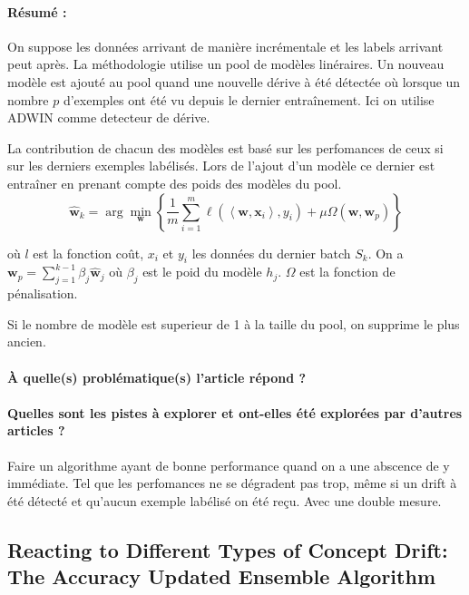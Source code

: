 \documentclass[11pt,a4paper]{report}
\begin{document}
\paragraph{Résumé :} On suppose les données arrivant de manière incrémentale et les labels arrivant peut après. La méthodologie utilise un pool de modèles linéraires. Un nouveau modèle est ajouté au pool quand une nouvelle dérive à été détectée où lorsque un nombre $p$ d'exemples ont été vu depuis le dernier entraînement. Ici on utilise ADWIN comme detecteur de dérive. 

La contribution de chacun des modèles est basé sur les perfomances de ceux si sur les derniers exemples labélisés. Lors de l'ajout d'un modèle ce dernier est entraîner en prenant compte des poids des modèles du pool. $$\hat{\mathbf{w}}_{k}=\arg \min _{\mathbf{w}}\left\{\frac{1}{m} \sum_{i=1}^{m} \ell\left(\left\langle\mathbf{w}, \mathbf{x}_{i}\right\rangle, y_{i}\right)+\mu \Omega\left(\mathbf{w}, \mathbf{w}_{p}\right)\right\}$$

où $l$ est la fonction coût, $x_i$ et $y_i$ les données du dernier batch $S_k$. On a $\mathbf{w}_{p}=\sum_{j=1}^{k-1} \beta_{j} \hat{\mathbf{w}}_{j}$ où $\beta_j$ est le poid du modèle $h_j$. $\Omega$ est la fonction de pénalisation.

Si le nombre de modèle est superieur de 1 à la taille du pool, on supprime le plus ancien.

\paragraph{À quelle(s) problématique(s) l'article répond ?} 

\paragraph{Quelles sont les pistes à explorer et ont-elles  été explorées par d'autres articles ?}  Faire un algorithme ayant de bonne performance quand on a une abscence de y immédiate. Tel que les perfomances ne se dégradent pas trop, même si un drift à été détecté et qu'aucun exemple labélisé on été reçu. Avec une double mesure.







\subsection{Reacting to Different Types of Concept Drift: The Accuracy Updated Ensemble Algorithm}
\end{document}
